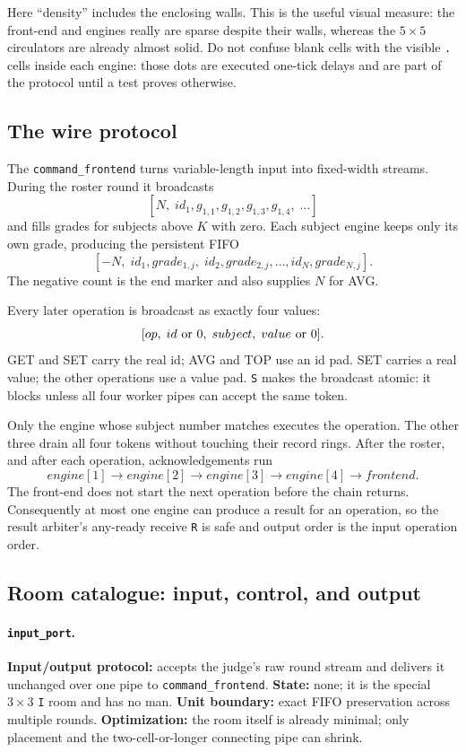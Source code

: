 \documentclass[11pt,a4paper]{article}
\newcommand{\op}[1]{\texttt{#1}}
\begin{document}
Here ``density'' includes the enclosing walls. This is the useful visual
measure: the front-end and engines really are sparse despite their walls,
whereas the $5\times5$ circulators are already almost solid. Do not confuse
blank cells with the visible \op{.} cells inside each engine: those dots are
executed one-tick delays and are part of the protocol until a test proves
otherwise.

\subsection{The wire protocol}

The \texttt{command\_frontend} turns variable-length input into fixed-width
streams. During the roster round it broadcasts
\[
 [N,\;id_1,g_{1,1},g_{1,2},g_{1,3},g_{1,4},\;\ldots]
\]
and fills grades for subjects above $K$ with zero. Each subject engine keeps
only its own grade, producing the persistent FIFO
\[
 [-N,\;id_1,grade_{1,j},\;id_2,grade_{2,j},\ldots,id_N,grade_{N,j}].
\]
The negative count is the end marker and also supplies $N$ for AVG.

Every later operation is broadcast as exactly four values:
\[
 [op,\;id\hbox{ or }0,\;subject,\;value\hbox{ or }0].
\]
GET and SET carry the real id; AVG and TOP use an id pad. SET carries a real
value; the other operations use a value pad. \op{S} makes the broadcast
atomic: it blocks unless all four worker pipes can accept the same token.

Only the engine whose subject number matches executes the operation. The
other three drain all four tokens without touching their record rings.
After the roster, and after each operation, acknowledgements run
\[
 engine[1]\longrightarrow engine[2]\longrightarrow engine[3]
 \longrightarrow engine[4]\longrightarrow frontend .
\]
The front-end does not start the next operation before the chain returns.
Consequently at most one engine can produce a result for an operation, so
the result arbiter's any-ready receive \op{R} is safe and output order is the
input operation order.

\subsection{Room catalogue: input, control, and output}

\paragraph{\texttt{input\_port}.}
\textbf{Input/output protocol:} accepts the judge's raw round stream and
delivers it unchanged over one pipe to \texttt{command\_frontend}.
\textbf{State:} none; it is the special $3\times3$ \texttt{I} room and has no
man. \textbf{Unit boundary:} exact FIFO preservation across multiple rounds.
\textbf{Optimization:} the room itself is already minimal; only placement and
the two-cell-or-longer connecting pipe can shrink.
\end{document}
